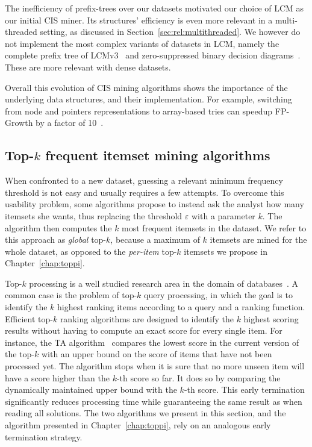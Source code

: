 The inefficiency of prefix-trees over our datasets motivated our choice of LCM
as our initial CIS miner.
Its structures' efficiency is even more relevant in a multi-threaded setting,
as discussed in Section~\ref{sec:rel:multithreaded}.
We however do not implement the most complex variants of datasets in LCM,
namely the complete prefix tree of LCMv3~\cite{UnoOSDM05} and
zero-suppressed binary decision diagrams~\cite{MinatoPAKDD08}.
These are more relevant with dense datasets.

Overall this evolution of CIS mining algorithms shows the importance
of the underlying data structures, and their implementation.
For example, switching from node and pointers representations to array-based tries
can speedup FP-Growth by a factor of 10~\cite{RaczOSDM05}.



\subsection{Top-$k$ frequent itemset mining algorithms}

When confronted to a new dataset,
guessing a relevant minimum frequency threshold is not easy and usually requires a few attempts.
To overcome this usability problem,
some algorithms propose to instead ask the analyst how many itemsets she wants,
thus replacing the threshold $\varepsilon$ with a parameter $k$.
The algorithm then computes the $k$ most frequent itemsets in the dataset.
We refer to this approach as {\em global} top-$k$,
because a maximum of $k$ itemsets are mined for the whole dataset,
as opposed to the {\em per-item} top-$k$ itemsets we propose in Chapter~\ref{chap:toppi}.

Top-$k$ processing is a well studied research area in the domain of databases~\cite{IlyasACM08}.
A common case is the problem of top-$k$ query processing,
in which the goal is to identify the $k$ highest ranking items according to a query and a ranking function.
Efficient top-$k$ ranking algorithms are designed to identify the $k$ highest scoring results
without having to compute an exact score for every single item.
For instance, the TA algorithm~\cite{FaginPODS01}
compares the lowest score in the current version of the top-$k$
with an upper bound on the score of items that have not been processed yet.
The algorithm stops when it is sure that no more unseen item will have a score higher
than the $k$-th score so far.
It does so by comparing the dynamically maintained upper bound with the $k$-th score.
This early termination significantly reduces processing time while guaranteeing the same result
as when reading all solutions.
The two algorithms we present in this section,
and the \toppi algorithm presented in Chapter~\ref{chap:toppi},
rely on an analogous early termination strategy.

